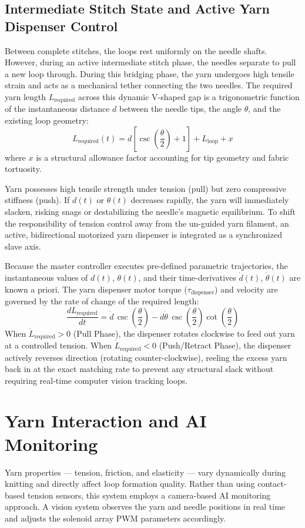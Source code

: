 \documentclass[10pt]{article}
\begin{document}
\subsection{Intermediate Stitch State and Active Yarn Dispenser Control}
Between complete stitches, the loops rest uniformly on the needle shafts. However, during an active intermediate stitch phase, the needles separate to pull a new loop through. During this bridging phase, the yarn undergoes high tensile strain and acts as a mechanical tether connecting the two needles. The required yarn length $L_{\mathrm{required}}$ across this dynamic V-shaped gap is a trigonometric function of the instantaneous distance $d$ between the needle tips, the angle $\theta$, and the existing loop geometry:
\[
L_{\mathrm{required}}(t)=d\left[\csc\left(\frac{\theta}{2}\right)+1\right]+L_{\mathrm{loop}}+x
\]
where $x$ is a structural allowance factor accounting for tip geometry and fabric tortuosity.

Yarn possesses high tensile strength under tension (pull) but zero compressive stiffness (push). If $d(t)$ or $\theta(t)$ decreases rapidly, the yarn will immediately slacken, risking snags or destabilizing the needle's magnetic equilibrium. To shift the responsibility of tension control away from the un-guided yarn filament, an active, bidirectional motorized yarn dispenser is integrated as a synchronized slave axis.

Because the master controller executes pre-defined parametric trajectories, the instantaneous values of $d(t)$, $\theta(t)$, and their time-derivatives $\dot{d}(t)$, $\dot{\theta}(t)$ are known a priori. The yarn dispenser motor torque ($\tau_{\mathrm{dispenser}}$) and velocity are governed by the rate of change of the required length:
\begin{equation}
\frac{dL_{\mathrm{required}}}{dt}=\dot{d}\,\csc\left(\frac{\theta}{2}\right)-d\dot{\theta}\,\csc\left(\frac{\theta}{2}\right)\cot\left(\frac{\theta}{2}\right)
\tag{7}
\end{equation}
When $\dot{L}_{\mathrm{required}}>0$ (Pull Phase), the dispenser rotates clockwise to feed out yarn at a controlled tension. When $\dot{L}_{\mathrm{required}}<0$ (Push/Retract Phase), the dispenser actively reverses direction (rotating counter-clockwise), reeling the excess yarn back in at the exact matching rate to prevent any structural slack without requiring real-time computer vision tracking loops.

\section{Yarn Interaction and AI Monitoring}
Yarn properties --- tension, friction, and elasticity --- vary dynamically during knitting and directly affect loop formation quality. Rather than using contact-based tension sensors, this system employs a camera-based AI monitoring approach. A vision system observes the yarn and needle positions in real time and adjusts the solenoid array PWM parameters accordingly.
\end{document}
